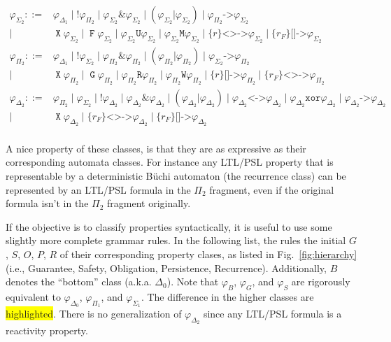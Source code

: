 \documentclass[a4paper,twoside,10pt,DIV=12]{scrreprt}
\DeclareMathOperator{\F}{\texttt{F}}
\DeclareMathOperator{\G}{\texttt{G}}
\newcommand{\U}{\mathbin{\texttt{U}}}
\newcommand{\R}{\mathbin{\texttt{R}}}
\DeclareMathOperator{\X}{\texttt{X}}
\newcommand{\M}{\mathbin{\texttt{M}}}
\newcommand{\W}{\mathbin{\texttt{W}}}
\DeclareMathOperator{\NOT}{\texttt{!}}
\newcommand{\XOR}{\mathbin{\texttt{xor}}}
\newcommand{\IMPLIES}{\mathbin{\texttt{->}}}
\newcommand{\EQUIV}{\mathbin{\texttt{<->}}}
\newcommand{\OR}{\mathbin{\texttt{|}}}
\newcommand{\AND}{\mathbin{\texttt{\&}}}
\newcommand{\0}{\texttt{0}}
\newcommand{\1}{\texttt{1}}
\newcommand{\Esuffix}{\texttt{<>->}}
\newcommand{\Asuffix}{\texttt{[]->}}
\newcommand{\sere}[1]{\texttt{\{}#1\texttt{\}}}
\begin{document}
\begin{align*}
  \varphi_{\Sigma_2} ::={}& \varphi_{\Delta_1} \mid \NOT\varphi_{\Pi_2}\mid
                   \varphi_{\Sigma_2}\AND \varphi_{\Sigma_2}\mid (\varphi_{\Sigma_2}\OR \varphi_{\Sigma_2})\mid
                   \varphi_{\Pi_2}\IMPLIES \varphi_{\Sigma_2}\\
           \mid{}& \X\varphi_{\Sigma_2} \mid \F\varphi_{\Sigma_2} \mid
                   \varphi_{\Sigma_2}\U\varphi_{\Sigma_2}\mid\varphi_{\Sigma_2}\M\varphi_{\Sigma_2}
                   \mid{} \sere{r}\Esuffix \varphi_{\Sigma_2}\mid \sere{r_F}\Asuffix \varphi_{\Sigma_2}\\
  \varphi_{\Pi_2} ::={}& \varphi_{\Delta_1} \mid \NOT\varphi_{\Sigma_2}\mid
                   \varphi_{\Pi_2}\AND \varphi_{\Pi_2}\mid (\varphi_{\Pi_2}\OR \varphi_{\Pi_2})\mid
                   \varphi_{\Sigma_2}\IMPLIES \varphi_{\Pi_2}\\
           \mid{}& \X\varphi_{\Pi_2} \mid \G\varphi_{\Pi_2} \mid
                   \varphi_{\Pi_2}\R\varphi_{\Pi_2}\mid
                   \varphi_{\Pi_2}\W\varphi_{\Pi_2} \mid{} \sere{r}\Asuffix \varphi_{\Pi_2}\mid \sere{r_F}\Esuffix \varphi_{\Pi_2}\\
  \varphi_{\Delta_2} ::={}& \varphi_{\Pi_2} \mid \varphi_{\Sigma_2}\mid \NOT\varphi_{\Delta_2}\mid
                   \varphi_{\Delta_2}\AND \varphi_{\Delta_2}\mid (\varphi_{\Delta_2}\OR \varphi_{\Delta_2})\mid
                   \varphi_{\Delta_2}\EQUIV \varphi_{\Delta_2}\mid \varphi_{\Delta_2}\XOR \varphi_{\Delta_2}\mid
                   \varphi_{\Delta_2}\IMPLIES \varphi_{\Delta_2}\\
           \mid{}& \X\varphi_{\Delta_2} \mid{} \sere{r_F}\Esuffix \varphi_{\Delta_2} \mid
                   \sere{r_F}\Asuffix \varphi_{\Delta_2}\\
\end{align*}


A nice property of these classes, is that they are as expressive as
their corresponding automata classes.  For instance any LTL/PSL
property that is representable by a deterministic Büchi automaton (the
recurrence class) can be represented by an LTL/PSL formula in the
$\Pi_2$ fragment, even if the original formula isn't in the $\Pi_2$
fragment originally.

If the objective is to classify properties syntactically, it is useful
to use some slightly more complete grammar rules.  In the following
list, the rules the initial $G$, $S$, $O$, $P$, $R$ of their
corresponding property clases, as listed in Fig.~\ref{fig:hierarchy}
(i.e., Guarantee, Safety, Obligation, Persistence, Recurrence).
Additionally, $B$ denotes the ``bottom'' class (a.k.a. $\Delta_0$).
Note that $\varphi_B$, $\varphi_G$, and $\varphi_S$ are rigorously
equivalent to $\varphi_{\Delta_0}$, $\varphi_{\Pi_1}$, and
$\varphi_{\Sigma_1}$.  The difference in the higher classes are
\colorbox{yellow}{highlighted}.  There is no generalization of
$\varphi_{\Delta_2}$ since any LTL/PSL formula is a reactivity
property.
\end{document}
